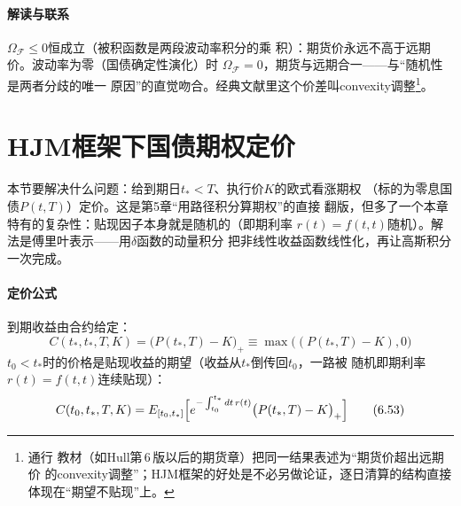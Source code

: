 \paragraph{解读与联系}
$\Omega_{\mathcal{F}}\leq0$恒成立（被积函数是两段波动率积分的乘
积）：期货价永远不高于远期价。波动率为零（国债确定性演化）时
$\Omega_{\mathcal{F}}=0$，期货与远期合一——与“随机性是两者分歧的唯一
原因”的直觉吻合。经典文献里这个价差叫convexity调整\footnote{通行
教材（如Hull第\,6\,版以后的期货章）把同一结果表述为“期货价超出远期价
的convexity调整”；HJM框架的好处是不必另做论证，逐日清算的结构直接
体现在“期望不贴现”上。}。

\section{HJM框架下国债期权定价}

本节要解决什么问题：给到期日$t_*<T$、执行价$K$的欧式看涨期权
（标的为零息国债$P(t,T)$）定价。这是第5章“用路径积分算期权”的直接
翻版，但多了一个本章特有的复杂性：贴现因子本身就是随机的（即期利率
$r(t)=f(t,t)$随机）。解法是傅里叶表示——用$\delta$函数的动量积分
把非线性收益函数线性化，再让高斯积分一次完成。

\paragraph{定价公式}
到期收益由合约给定：
\begin{equation*}
C(t_*,t_*,T,K)=\bigl(P(t_*,T)-K\bigr)_+
\equiv\max\bigl((P(t_*,T)-K),0\bigr)
\end{equation*}
$t_0<t_*$时的价格是贴现收益的期望（收益从$t_*$倒传回$t_0$，一路被
随机即期利率$r(t)=f(t,t)$连续贴现）：
\begin{equation*}
C(t_0,t_*,T,K)=E_{[t_0,t_*]}\Bigl[e^{-\int_{t_0}^{t_*}dt\,r(t)}
\bigl(P(t_*,T)-K\bigr)_+\Bigr]
\tag{6.53}
\end{equation*}

